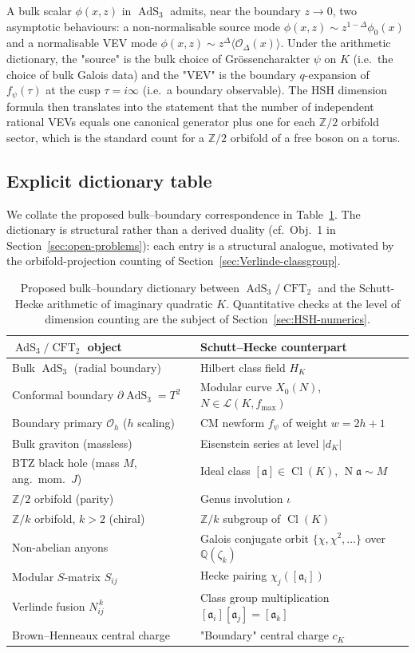 \documentclass[11pt,a4paper]{amsart}
\theoremstyle{definition}
\DeclareMathOperator{\Cl}{Cl}
\DeclareMathOperator{\Nm}{N}
\DeclareMathOperator{\AdS}{AdS}
\DeclareMathOperator{\CFT}{CFT}
\newcommand{\Q}{\mathbb{Q}}
\newcommand{\Z}{\mathbb{Z}}
\newcommand{\fa}{\mathfrak{a}}
\newcommand{\Lcal}{\mathcal{L}}
\newcommand{\Ocal}{\mathcal{O}}
\begin{document}
A bulk scalar $\phi(x, z)$ in $\AdS_3$ admits, near the boundary $z \to 0$, two
asymptotic behaviours: a non-normalisable source mode $\phi(x, z) \sim z^{1-\Delta}\phi_0(x)$
and a normalisable VEV mode $\phi(x, z) \sim z^{\Delta}\langle \Ocal_\Delta(x)\rangle$.
Under the arithmetic dictionary, the "source" is the bulk choice of Gr\"ossencharakter
$\psi$ on $K$ (i.e.\ the choice of bulk Galois data) and the "VEV" is the boundary
$q$-expansion of $f_\psi(\tau)$ at the cusp $\tau = i\infty$ (i.e.\ a boundary observable).
The HSH dimension formula then translates into the statement that the number of
independent rational VEVs equals one canonical generator plus one for each
$\Z/2$ orbifold sector, which is the standard count for a $\Z/2$ orbifold of a free
boson on a torus.

\subsection{Explicit dictionary table}\label{ss:dictionary}

We collate the proposed bulk--boundary correspondence in Table~\ref{tab:dictionary}.
The dictionary is structural rather than a derived duality (cf.\ Obj.~1 in
Section~\ref{sec:open-problems}): each entry is a structural analogue, motivated by
the orbifold-projection counting of Section~\ref{sec:Verlinde-classgroup}.

\begin{table}[h]
\centering
\small
\begin{tabular}{ll}
\toprule
$\AdS_3/\CFT_2$ object & Schutt--Hecke counterpart \\
\midrule
Bulk $\AdS_3$ (radial boundary) & Hilbert class field $H_K$ \\
Conformal boundary $\partial \AdS_3 = T^2$ & Modular curve $X_0(N)$, $N \in \Lcal(K, f_{\max})$ \\
Boundary primary $\Ocal_h$ ($h$ scaling) & CM newform $f_\psi$ of weight $w = 2h + 1$ \\
Bulk graviton (massless) & Eisenstein series at level $|d_K|$ \\
BTZ black hole (mass $M$, ang.\ mom.\ $J$) & Ideal class $[\fa]\in\Cl(K)$, $\Nm\fa \sim M$ \\
$\Z/2$ orbifold (parity) & Genus involution $\iota$ \\
$\Z/k$ orbifold, $k > 2$ (chiral) & $\Z/k$ subgroup of $\Cl(K)$ \\
Non-abelian anyons & Galois conjugate orbit $\{\chi, \chi^2, \ldots\}$ over $\Q(\zeta_k)$ \\
Modular $S$-matrix $S_{ij}$ & Hecke pairing $\chi_j([\fa_i])$ \\
Verlinde fusion $N_{ij}^{\,k}$ & Class group multiplication $[\fa_i][\fa_j] = [\fa_k]$ \\
Brown--Henneaux central charge & "Boundary" central charge $c_K$ \\
\bottomrule
\end{tabular}
\caption{Proposed bulk--boundary dictionary between $\AdS_3/\CFT_2$ and the
Schutt-Hecke arithmetic of imaginary quadratic $K$. Quantitative checks at the level of
dimension counting are the subject of Section~\ref{sec:HSH-numerics}.}
\label{tab:dictionary}
\end{table}
\end{document}
